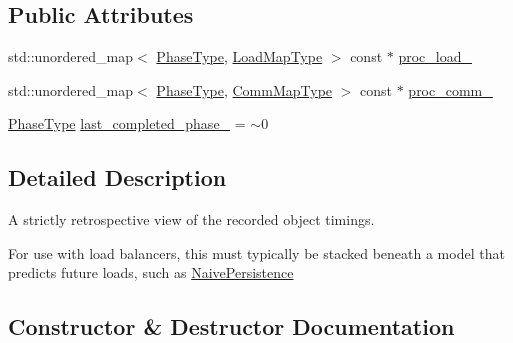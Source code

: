 \subsection*{Public Attributes}
\begin{DoxyCompactItemize}
\item 
std\+::unordered\+\_\+map$<$ \hyperlink{namespacevt_a46ce6733d5cdbd735d561b7b4029f6d7}{Phase\+Type}, \hyperlink{namespacevt_1_1vrt_1_1collection_1_1balance_a5339303db2e1ce964d783a53fd74e6b1}{Load\+Map\+Type} $>$ const  $\ast$ \hyperlink{structvt_1_1vrt_1_1collection_1_1balance_1_1_raw_data_a8ba841120376e38c83484365b57fc719}{proc\+\_\+load\+\_\+}
\item 
std\+::unordered\+\_\+map$<$ \hyperlink{namespacevt_a46ce6733d5cdbd735d561b7b4029f6d7}{Phase\+Type}, \hyperlink{namespacevt_1_1vrt_1_1collection_1_1balance_a01ee1fb0ae2da1d2ab7fdca3be9ae351}{Comm\+Map\+Type} $>$ const  $\ast$ \hyperlink{structvt_1_1vrt_1_1collection_1_1balance_1_1_raw_data_a1e350ebf1bd9b3c94fdbc371779b8832}{proc\+\_\+comm\+\_\+}
\item 
\hyperlink{namespacevt_a46ce6733d5cdbd735d561b7b4029f6d7}{Phase\+Type} \hyperlink{structvt_1_1vrt_1_1collection_1_1balance_1_1_raw_data_a9ceb9cf1dd88772821658e506d015397}{last\+\_\+completed\+\_\+phase\+\_\+} = $\sim$0
\end{DoxyCompactItemize}


\subsection{Detailed Description}
A strictly retrospective view of the recorded object timings. 

For use with load balancers, this must typically be stacked beneath a model that predicts future loads, such as \hyperlink{structvt_1_1vrt_1_1collection_1_1balance_1_1_naive_persistence}{Naive\+Persistence} 

\subsection{Constructor \& Destructor Documentation}
\mbox{\label{structvt_1_1vrt_1_1collection_1_1balance_1_1_raw_data_a4879ed47b7d3da3008dc6199adc6d519}} 
